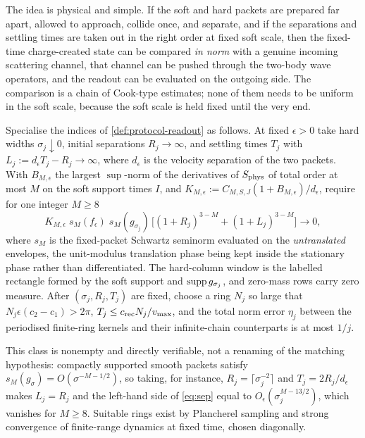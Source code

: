The idea is physical and simple. If the soft and hard packets are prepared far
apart, allowed to approach, collide once, and separate, and if the
separations and settling times are taken out in the right order at fixed soft
scale, then the fixed-time charge-created state can be compared \emph{in norm}
with a genuine incoming scattering channel, that channel can be pushed through
the two-body wave operators, and the readout can be evaluated on the outgoing
side. The comparison is a chain of Cook-type estimates; none of them needs to
be uniform in the soft scale, because the soft scale is held fixed until the
very end.

\begin{definition}
\label{def:separated-preparation}
Specialise the indices of \cref{def:protocol-readout} as follows. At fixed
$\epsilon>0$ take hard widths $\sigma_j\downarrow0$, initial separations
$R_j\to\infty$, and settling times $T_j$ with
$L_j:=d_\epsilon T_j-R_j\to\infty$, where $d_\epsilon$ is the velocity
separation of the two packets. With
$B_{M,\epsilon}$ the largest $\sup$-norm of the derivatives of
$S_{\rm phys}$ of total order at most $M$ on the soft support times $I$, and
$K_{M,\epsilon}:=C_{M,S,J}(1+B_{M,\epsilon})/d_\epsilon$, require for one
integer $M\ge8$
\begin{equation}
  K_{M,\epsilon}\;s_M(f_\epsilon)\;s_M(g_{\sigma_j})\,
  \bigl[(1+R_j)^{3-M}+(1+L_j)^{3-M}\bigr]\longrightarrow0,
  \label{eq:sep}
\end{equation}
where $s_M$ is the fixed-packet Schwartz seminorm evaluated on the
\emph{untranslated} envelopes, the unit-modulus translation phase being kept
inside the stationary phase rather than differentiated. The hard-column window
is the labelled rectangle formed by the soft support and $\operatorname{supp} g_{\sigma_j}$,
and zero-mass rows carry zero measure. After $(\sigma_j,R_j,T_j)$ are fixed,
choose a ring $N_j$ so large that $N_j\epsilon(c_2-c_1)>2\pi$,
$T_j\le c_{\rm rec}N_j/v_{\max}$, and the total norm error $\eta_j$ between
the periodised finite-ring kernels and their infinite-chain counterparts is at
most $1/j$.
\end{definition}

This class is nonempty and directly verifiable, not a renaming of the matching
hypothesis: compactly supported smooth packets satisfy
$s_M(g_\sigma)=O(\sigma^{-M-1/2})$, so taking, for instance,
$R_j=\lceil\sigma_j^{-2}\rceil$ and $T_j=2R_j/d_\epsilon$ makes $L_j=R_j$ and
the left-hand side of \cref{eq:sep} equal to $O_\epsilon(\sigma_j^{M-13/2})$,
which vanishes for $M\ge8$. Suitable rings exist by Plancherel sampling and
strong convergence of finite-range dynamics at fixed time, chosen diagonally.

